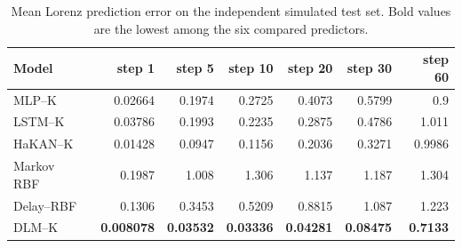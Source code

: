\begin{table}[pos=!htbp]
\caption{Mean Lorenz prediction error on the independent simulated test set. Bold values are the lowest among the six compared predictors.}
\label{tab:lorenz-independent}
\centering\small
\setlength{\tabcolsep}{5pt}
\begin{tabular}{@{}lrrrrrr@{}}\toprule
Model & step 1 & step 5 & step 10 & step 20 & step 30 & step 60 \\\midrule
MLP--K~\cite{Lusch2018} & 0.02664 & 0.1974 & 0.2725 & 0.4073 & 0.5799 & 0.9 \\
LSTM--K~\cite{Han2024DRKO} & 0.03786 & 0.1993 & 0.2235 & 0.2875 & 0.4786 & 1.011 \\
HaKAN--K~\cite{Hasan2026} & 0.01428 & 0.0947 & 0.1156 & 0.2036 & 0.3271 & 0.9986 \\
Markov RBF~\cite{Williams2015,Korda2018} & 0.1987 & 1.008 & 1.306 & 1.137 & 1.187 & 1.304 \\
Delay--RBF~\cite{Pan2020TimeDelay} & 0.1306 & 0.3453 & 0.5209 & 0.8815 & 1.087 & 1.223 \\
DLM--K & \textbf{0.008078} & \textbf{0.03532} & \textbf{0.03336} & \textbf{0.04281} & \textbf{0.08475} & \textbf{0.7133} \\
\bottomrule\end{tabular}
\end{table}
